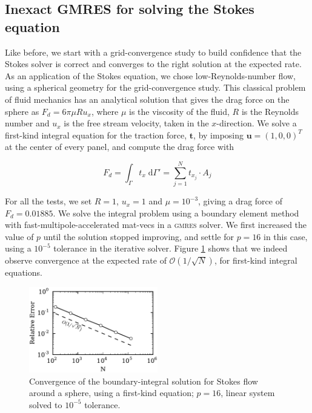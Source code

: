 \documentclass[final,leqno,]{siamltex1213}
\renewcommand{\O}[1]{\mathcal{O}(#1)}
\newcommand{\gmres}{\textsc{gmres}\xspace}
\newcommand{\di}[1]{\text{d}#1}
\newcommand{\vect}[1]{\mathbf{#1}}
\begin{document}
\subsection{Inexact {\small GMRES} for solving the Stokes equation}
Like before, we start with a grid-convergence study to build confidence that the Stokes solver is correct and converges to the right solution at the expected rate. As an application of the Stokes equation, we chose low-Reynolds-number flow, using a spherical geometry for the grid-convergence study. This classical problem of fluid mechanics has an analytical solution that gives the drag force on the sphere as $F_d = 6\pi\mu Ru_x$, where $\mu$ is the viscosity of the fluid, $R$ is the Reynolds number and $u_x$ is the free stream velocity, taken in the $x$-direction. We solve a first-kind integral equation for the traction force, $\vect{t}$, by imposing $\vect{u} = (1,0,0)^{T}$ at the center of every panel, and compute the drag force with

\begin{equation}
	\label{eqn:stokes_traction_drag}
	F_d = \int_\Gamma t_x\;\di{\Gamma'} = \sum_{j=1}^{N} t_{x_j}\cdot A_j
\end{equation}

For all the tests, we set $R=1$, $u_x = 1$ and $\mu = 10^{-3}$, giving a drag force of $F_d = 0.01885$. We solve the integral problem using a boundary element method with fast-multipole-accelerated mat-vecs in a \gmres solver. We first increased the value of $p$ until the solution stopped improving, and settle for $p=16$ in this case, using a $10^{-5}$ tolerance in the iterative solver.
Figure \ref{fig:stokes_convergence} shows that we indeed observe convergence at the expected rate of $\O{1 / \sqrt{N}}$, for first-kind integral equations.

\begin{figure}[ht]
\begin{center}
	\includegraphics[natwidth=3in,natheight=2in,width=0.5\textwidth]{StokesConvergence.pdf}
	\caption{Convergence of the boundary-integral solution for Stokes flow around a sphere, using a  first-kind equation; $p=16$, linear system solved to $10^{-5}$ tolerance.}
	\label{fig:stokes_convergence}
\end{center}
\end{figure}
\end{document}
